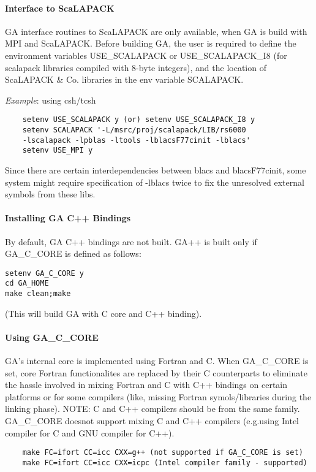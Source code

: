 \paragraph{Interface to ScaLAPACK}

GA interface routines to ScaLAPACK are only available, when GA is
build with MPI and ScaLAPACK. Before building GA, the user is required
to define the environment variables USE\_SCALAPACK or USE\_SCALAPACK\_I8
(for scalapack libraries compiled with 8-byte integers), and the location
of ScaLAPACK \& Co. libraries in the env variable SCALAPACK.

\emph{Example}: using csh/tcsh
\begin{verbatim}
    setenv USE_SCALAPACK y (or) setenv USE_SCALAPACK_I8 y
    setenv SCALAPACK '-L/msrc/proj/scalapack/LIB/rs6000
    -lscalapack -lpblas -ltools -lblacsF77cinit -lblacs'
    setenv USE_MPI y
\end{verbatim}
Since there are certain interdependencies between blacs and blacsF77cinit,
some system might require specification of -lblacs twice to fix the
unresolved external symbols from these libs.


\paragraph{Installing GA C++ Bindings}

By default, GA C++ bindings are not built. GA++ is built only if GA\_C\_CORE
is defined as follows: 
\begin{verbatim}
setenv GA_C_CORE y
cd GA_HOME
make clean;make
\end{verbatim}
(This will build GA with C core and C++ binding).


\paragraph{Using GA\_C\_CORE}

GA's internal core is implemented using Fortran and C. When GA\_C\_CORE
is set, core Fortran functionalites are replaced by their C counterparts
to eliminate the hassle involved in mixing Fortran and C with C++
bindings on certain platforms or for some compilers (like, missing
Fortran symols/libraries during the linking phase). NOTE: C and C++
compilers should be from the same family. GA\_C\_CORE doesnot support
mixing C and C++ compilers (e.g.using Intel compiler for C and GNU
compiler for C++). 
\begin{verbatim}
    make FC=ifort CC=icc CXX=g++ (not supported if GA_C_CORE is set)
    make FC=ifort CC=icc CXX=icpc (Intel compiler family - supported)
\end{verbatim}

